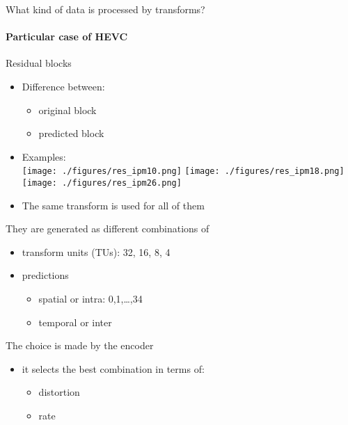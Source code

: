 \documentclass[10pt]{beamer} %
\begin{document}
\begin{frame}{What kind of data is processed by transforms?}
	\framesubtitle{Particular case of HEVC}
	\begin{minipage}{0.38\textwidth}
		\begin{block}{Residual blocks}
			\begin{itemize}
				\item Difference between:
					\begin{itemize}
						\item original block
						\item predicted block
					\end{itemize}
				\item Examples:\\[0.5em]
					\texttt{[image: ./figures/res\_ipm10.png]}
					\hfill
					\texttt{[image: ./figures/res\_ipm18.png]}
					\hfill
					\texttt{[image: ./figures/res\_ipm26.png]}
				\item The same transform is used for all of them
			\end{itemize}
		\end{block}
	\end{minipage}
	\hfill
	\begin{minipage}{0.58\textwidth}
		\begin{block}{They are generated as different combinations of}
			\begin{itemize}
				\item transform units (TUs): 32, 16, 8, 4
				\item predictions
					\begin{itemize}
						\item spatial or intra: 0,1,\ldots,34
						\item temporal or inter
					\end{itemize}
			\end{itemize}
		\end{block}
		\begin{block}{The choice is made by the encoder}
			\begin{itemize}
				\item it selects the best combination in terms of:
					\begin{itemize}
						\item distortion
						\item rate
					\end{itemize}
			\end{itemize}
		\end{block}
	\end{minipage}
\end{frame}
\end{document}
